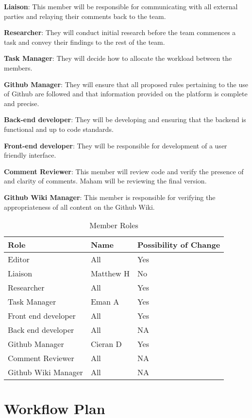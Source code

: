 \documentclass{article}
\begin{document}
\textbf{Liaison}: This member will be responsible for communicating with all external parties and relaying their comments back to the team.

\textbf{Researcher}: They will conduct initial research before the team commences a task and convey their findings to the rest of the team.

\textbf{Task Manager}: They will decide how to allocate the workload between the members.

\textbf{Github Manager}: They will ensure that all proposed rules pertaining to the use of Github are followed and that information provided on the platform is complete and precise.

\textbf{Back-end developer}: They will be developing and ensuring that the backend is functional and up to code standards.

\textbf{Front-end developer}: They will be responsible for development of a user friendly interface.

\textbf{Comment Reviewer}: This member will review code and verify the presence of and clarity of comments. Maham will be reviewing the final version.

\textbf{Github Wiki Manager}: This member is responsible for verifying the appropriateness of all content on the Github Wiki.

\begin{table}[H]
\caption{Member Roles} \label{Proposed Assignments}
\begin{tabularx}{\textwidth}{llX}
\toprule
\textbf{Role} & \textbf{Name} & \textbf{Possibility of Change}\\
\midrule
Editor & All & Yes\\
Liaison & Matthew H  & No\\
Researcher & All & Yes \\
Task Manager & Eman A & Yes \\
Front end developer & All & Yes \\
Back end developer & All & NA \\
Github Manager & Cieran D & Yes \\
Comment Reviewer & All & NA \\
Github Wiki Manager & All & NA \\
\bottomrule
\end{tabularx}
\end{table}



\section{Workflow Plan}
\end{document}
